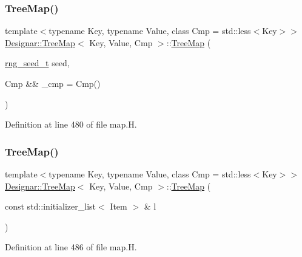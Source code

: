 \subsubsection{\texorpdfstring{Tree\+Map()}{TreeMap()}\hspace{0.1cm}{\footnotesize\ttfamily [4/7]}}
{\footnotesize\ttfamily template$<$typename Key, typename Value, class Cmp = std\+::less$<$\+Key$>$$>$ \\
\hyperlink{class_designar_1_1_tree_map}{Designar\+::\+Tree\+Map}$<$ Key, Value, Cmp $>$\+::\hyperlink{class_designar_1_1_tree_map}{Tree\+Map} (\begin{DoxyParamCaption}\item[{\hyperlink{namespace_designar_ad621b5646d45288c5d6a1e1dfe7531a8}{rng\+\_\+seed\+\_\+t}}]{seed,  }\item[{Cmp \&\&}]{\+\_\+cmp = {\ttfamily Cmp()} }\end{DoxyParamCaption})\hspace{0.3cm}{\ttfamily [inline]}}



Definition at line 480 of file map.\+H.

\mbox{\label{class_designar_1_1_tree_map_add7b0ee1ebafb7894771c14029e2aeca}} 
\subsubsection{\texorpdfstring{Tree\+Map()}{TreeMap()}\hspace{0.1cm}{\footnotesize\ttfamily [5/7]}}
{\footnotesize\ttfamily template$<$typename Key, typename Value, class Cmp = std\+::less$<$\+Key$>$$>$ \\
\hyperlink{class_designar_1_1_tree_map}{Designar\+::\+Tree\+Map}$<$ Key, Value, Cmp $>$\+::\hyperlink{class_designar_1_1_tree_map}{Tree\+Map} (\begin{DoxyParamCaption}\item[{const std\+::initializer\+\_\+list$<$ Item $>$ \&}]{l }\end{DoxyParamCaption})\hspace{0.3cm}{\ttfamily [inline]}}



Definition at line 486 of file map.\+H.

\mbox{\label{class_designar_1_1_tree_map_a5b71308661829869487a7c904a37fb09}} 
